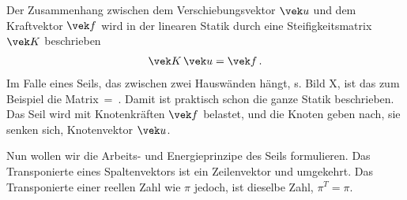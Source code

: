 Der Zusammenhang zwischen dem Verschiebungsvektor $\vek u $ und dem Kraftvektor $\vek f $ wird in der linearen Statik durch eine Steifigkeitsmatrix $\vek K $ beschrieben
\begin{align}
\vek K\,\vek u = \vek f\,.
\end{align}
Im Falle eines Seils, das zwischen zwei Hausw\"{a}nden h\"{a}ngt, s. Bild X, ist das zum Beispiel die Matrix
\beq\label{Eq176}
\, = \,.
\eeq
Damit  ist praktisch schon die ganze Statik beschrieben. Das Seil wird mit Knotenkr\"{a}ften $\vek f$  belastet,  und die Knoten geben nach, sie senken sich, Knotenvektor $\vek u $.

Nun wollen wir die Arbeits- und Energieprinzipe des Seils formulieren. Das Transponierte eines Spaltenvektors ist ein Zeilenvektor und umgekehrt. Das Transponierte einer reellen Zahl wie $\pi$ jedoch, ist dieselbe Zahl, $\pi^T = \pi$.

